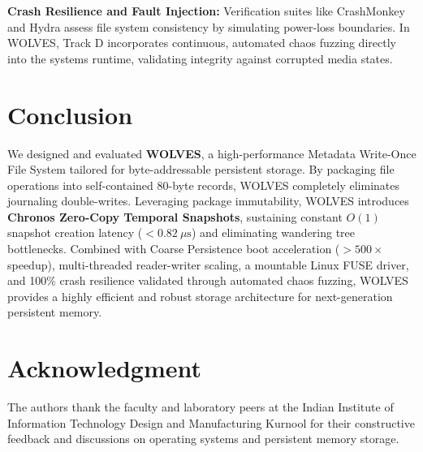 \documentclass[conference]{IEEEtran}
\begin{document}
\textbf{Crash Resilience and Fault Injection:} Verification suites like CrashMonkey \cite{crashmonkey} and Hydra \cite{hydra} assess file system consistency by simulating power-loss boundaries. In WOLVES, Track D incorporates continuous, automated chaos fuzzing directly into the systems runtime, validating integrity against corrupted media states.

\section{Conclusion}
We designed and evaluated \textbf{WOLVES}, a high-performance Metadata Write-Once File System tailored for byte-addressable persistent storage. By packaging file operations into self-contained 80-byte records, WOLVES completely eliminates journaling double-writes. Leveraging package immutability, WOLVES introduces \textbf{Chronos Zero-Copy Temporal Snapshots}, sustaining constant $O(1)$ snapshot creation latency ($<0.82~\mu\text{s}$) and eliminating wandering tree bottlenecks. Combined with Coarse Persistence boot acceleration ($>500\times$ speedup), multi-threaded reader-writer scaling, a mountable Linux FUSE driver, and 100\% crash resilience validated through automated chaos fuzzing, WOLVES provides a highly efficient and robust storage architecture for next-generation persistent memory.

\section*{Acknowledgment}
The authors thank the faculty and laboratory peers at the Indian Institute of Information Technology Design and Manufacturing Kurnool for their constructive feedback and discussions on operating systems and persistent memory storage.
\end{document}
